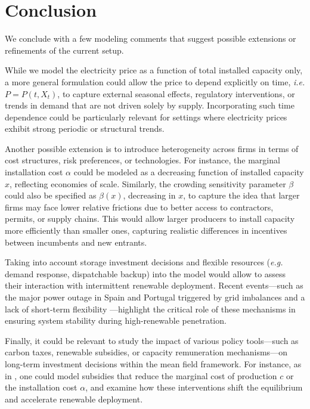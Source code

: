 \documentclass[12pt]{article}
\begin{document}
\section{Conclusion}\label{sec:conclusion}




We conclude with a few modeling comments that suggest possible extensions or refinements of the current setup.

While we model the electricity price as a function of total installed capacity only, a more general formulation could allow the price to depend explicitly on time, \textit{i.e.} $ P = P(t, X_t)$, to capture external seasonal effects, regulatory interventions, or trends in demand that are not driven solely by supply. Incorporating such time dependence could be particularly relevant for settings where electricity prices exhibit strong periodic or structural trends.

Another possible extension is to introduce heterogeneity across firms in terms of cost structures, risk preferences, or technologies. For instance, the marginal installation cost \( \alpha \) could be modeled as a decreasing function of installed capacity \( x \), reflecting economies of scale. Similarly, the crowding sensitivity parameter \( \beta \) could also be specified as \( \beta(x) \), decreasing in \( x \), to capture the idea that larger firms may face lower relative frictions due to better access to contractors, permits, or supply chains. This would allow larger producers to install capacity more efficiently than smaller ones, capturing realistic differences in incentives between incumbents and new entrants. 

Taking into account storage investment decisions and flexible resources (\textit{e.g.} demand response, dispatchable backup) into the model would allow to assess their interaction with intermittent renewable deployment. Recent events—such as the major power outage in Spain and Portugal triggered by grid imbalances and a lack of short-term flexibility \cite{bajo-buenestado2025iberian}—highlight the critical role of these mechanisms in ensuring system stability during high-renewable penetration.

Finally, it could be relevant to study the impact of various policy tools—such as carbon taxes, renewable subsidies, or capacity remuneration mechanisms—on long-term investment decisions within the mean field framework. For instance, as in \cite{alasseur2023mean}, one could model subsidies that reduce the marginal cost of production \( c \) or the installation cost \( \alpha \), and examine how these interventions shift the equilibrium and accelerate renewable deployment.

 
\end{document}
